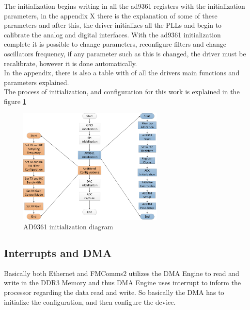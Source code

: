 The initialization begins writing in all the ad9361 registers with the
initialization parameters, in the appendix X there is the explanation of some
of these parameters  and after this, the driver initializes all the PLLs and begin
to calibrate the analog and digital interfaces. With the ad9361 initialization
complete it is possible to change parameters, reconfigure filters and  change
oscillators frequency, if any parameter such as this is changed, the driver
must be recalibrate, however it is done automatically.\\

In the appendix, there is also a table with of all the
drivers main functions and parameters explained.\\



The process of initialization, and configuration for this work is explained in
the figure \ref{fig:ad9361init}


\begin{figure}[htbp]
    \centering
    \includegraphics[width=0.65\textwidth]{./figures/ad9361_driver}
    \caption{ AD9361 initialization diagram
    \label{fig:ad9361init}}
\end{figure}

\subsection{Interrupts and DMA}

Basically both Ethernet and FMComms2 utilizes the DMA Engine to read and write in
the DDR3 Memory and thus DMA Engine uses interrupt to inform the processor regarding
the data read and write. So basically the DMA has to initialize the configuration,
and then configure the device.\\

